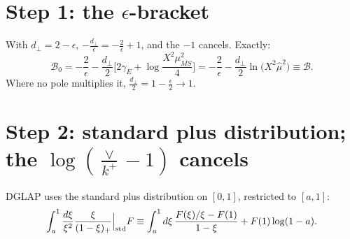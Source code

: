 \documentclass[10pt]{article}
\numberwithin{equation}{section}
\newcommand{\MSb}{\overline{MS}}
\begin{document}
\section{Step 1: the $\epsilon$-bracket}
With $d_\perp=2-\epsilon$, $-\frac{d_\perp}{\epsilon}=-\frac2\epsilon+1$, and the $-1$ cancels. Exactly:
\begin{equation}
\mathcal B_0=-\frac{2}{\epsilon}-\frac{d_\perp}{2}\Big[2\gamma_E+\log\frac{X^2\mu^2_{\MSb}}{4}\Big]=-\frac2\epsilon-\frac{d_\perp}{2}\ln\big(X^2\hat\mu^2\big)\equiv\mathcal B .
\end{equation}
Where no pole multiplies it, $\frac{d_\perp}{2}=1-\frac\epsilon2\to1$.

\section{Step 2: standard plus distribution; the $\log(\frac{\vee}{k^+}-1)$ cancels}
DGLAP uses the standard plus distribution on $[0,1]$, restricted to $[a,1]$:
\begin{equation}
\int_a^1\frac{d\xi}{\xi^2}\frac{\xi}{(1-\xi)_+}\Big|_{\rm std}F\equiv\int_a^1d\xi\,\frac{F(\xi)/\xi-F(1)}{1-\xi}+F(1)\log(1-a).\label{eq:std}
\end{equation}
\end{document}
